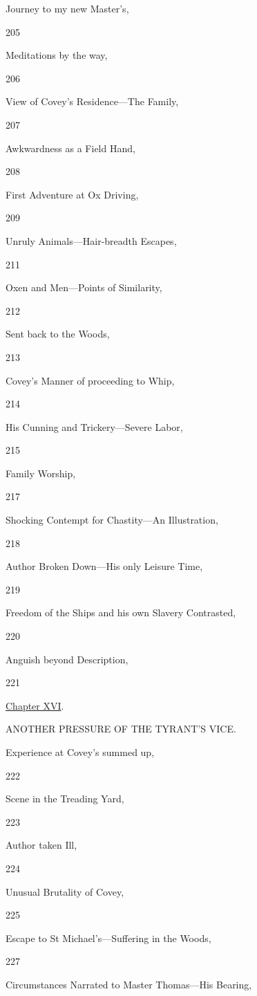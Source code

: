 Journey to my new Master's,

205

Meditations by the way,

206

View of Covey's Residence---The Family,

207

Awkwardness as a Field Hand,

208

First Adventure at Ox Driving,

209

Unruly Animals---Hair-breadth Escapes,

211

Oxen and Men---Points of Similarity,

212

Sent back to the Woods,

213

Covey's Manner of proceeding to Whip,

214

His Cunning and Trickery---Severe Labor,

215

Family Worship,

217

Shocking Contempt for Chastity---An Illustration,

218

Author Broken Down---His only Leisure Time,

219

Freedom of the Ships and his own Slavery Contrasted,

220

Anguish beyond Description,

221

\href{/wiki/My_Bondage_and_My_Freedom_(1855)/Chapter_XVI}{Chapter XVI}.

ANOTHER PRESSURE OF THE TYRANT'S VICE.

Experience at Covey's summed up,

222

Scene in the Treading Yard,

223

Author taken Ill,

224

Unusual Brutality of Covey,

225

Escape to St Michael's---Suffering in the Woods,

227

Circumstances Narrated to Master Thomas---His Bearing,

